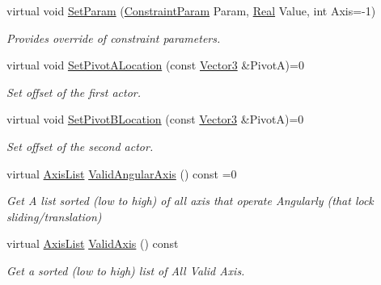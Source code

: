 \begin{DoxyCompactItemize}
virtual void \hyperlink{classphys_1_1TypedConstraint_adc1375a6adb954adb28615ff7c4cec4e}{SetParam} (\hyperlink{namespacephys_aa1e7cf2d7efcaeaeac304f711e7564e8}{ConstraintParam} Param, \hyperlink{namespacephys_af7eb897198d265b8e868f45240230d5f}{Real} Value, int Axis=-\/1)
\begin{DoxyCompactList}\small\item\em Provides override of constraint parameters. \item\end{DoxyCompactList}\item 
virtual void \hyperlink{classphys_1_1TypedConstraint_aaa301fee77aa6e20ab202f604f0e9518}{SetPivotALocation} (const \hyperlink{classphys_1_1Vector3}{Vector3} \&PivotA)=0
\begin{DoxyCompactList}\small\item\em Set offset of the first actor. \item\end{DoxyCompactList}\item 
virtual void \hyperlink{classphys_1_1TypedConstraint_a518b3a40e517e21da8049e645a69fc96}{SetPivotBLocation} (const \hyperlink{classphys_1_1Vector3}{Vector3} \&PivotA)=0
\begin{DoxyCompactList}\small\item\em Set offset of the second actor. \item\end{DoxyCompactList}\item 
virtual \hyperlink{classphys_1_1TypedConstraint_a26261a4055e84e104c58d84eea5667c2}{AxisList} \hyperlink{classphys_1_1TypedConstraint_afd67483ff73a4b8ffef17c149b8a6cfa}{ValidAngularAxis} () const =0
\begin{DoxyCompactList}\small\item\em Get A list sorted (low to high) of all axis that operate Angularly (that lock sliding/translation) \item\end{DoxyCompactList}\item 
virtual \hyperlink{classphys_1_1TypedConstraint_a26261a4055e84e104c58d84eea5667c2}{AxisList} \hyperlink{classphys_1_1TypedConstraint_a6db21f6c516be6c98d9fa21963f30445}{ValidAxis} () const 
\begin{DoxyCompactList}\small\item\em Get a sorted (low to high) list of All Valid Axis. \item\end{DoxyCompactList}\item 

\end{DoxyCompactItemize}
